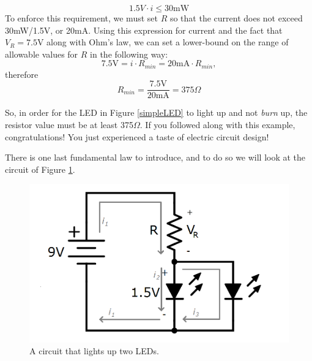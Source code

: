 $$
1.5V \cdot i \leq 30\textrm{mW}
$$
To enforce this requirement, we must set $R$ so that the current does not exceed 30mW/1.5V, or 20mA. Using this expression for current and the fact that $V_R=7.5\textrm{V}$ along with Ohm's law, we can set a lower-bound on the range of allowable values for $R$ in the following way:
$$
7.5\textrm{V} = i \cdot R_{min} = 20\textrm{mA} \cdot R_{min},
$$
therefore
$$
R_{min} = \frac{7.5\textrm{V}}{20\textrm{mA}} = 375\Omega
$$
\par
So, in order for the LED in Figure \ref{simpleLED} to light up and not \textit{burn} up, the resistor value must be at least 375$\Omega$. If you followed along with this example, congratulations! You just experienced a taste of electric circuit design!
\par
There is one last fundamental law to introduce, and to do so we will look at the circuit of Figure \ref{twoLEDs}.
\begin{figure}[h!]
\centering
\includegraphics[width=12cm]{figures/twoLEDsCircuit.png}
\caption{A circuit that lights up two LEDs.}
\label{twoLEDs}
\end{figure}

